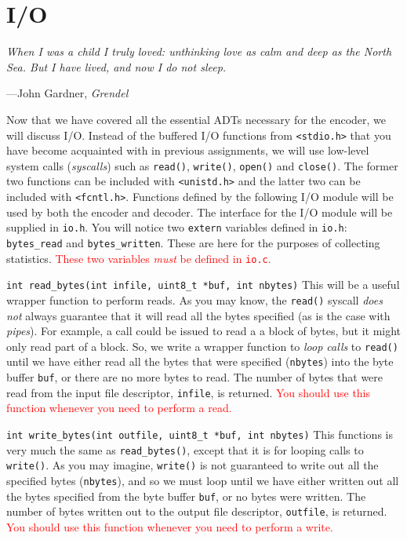 \section{I/O}
\textwidth
\epigraph{\emph{
When I was a child I truly loved:
unthinking love as calm and deep
as the North Sea. But I have lived,
and now I do not sleep.}}{---John Gardner, \emph{Grendel}}

\noindent Now that we have covered all the essential ADTs necessary for
the encoder, we will discuss I/O. Instead of the buffered I/O functions
from \texttt{<stdio.h>} that you have become acquainted with in previous
assignments, we will use low-level system calls (\emph{syscalls}) such
as \texttt{read()}, \texttt{write()}, \texttt{open()} and
\texttt{close()}. The former two functions can be included with
\texttt{<unistd.h>} and the latter two can be included with
\texttt{<fcntl.h>}. Functions defined by the following I/O module will
be used by both the encoder and decoder. The interface for the I/O
module will be supplied in \texttt{io.h}. You will notice two
\texttt{extern} variables defined in \texttt{io.h}: \texttt{bytes\_read}
and \texttt{bytes\_written}. These are here for the purposes of
collecting statistics. \textcolor{red}{These two variables \emph{must}
be defined in \texttt{io.c}.}

\begin{funcdoc}{\texttt{int read\_bytes(int infile, uint8\_t *buf, int
nbytes)}}
  This will be a useful wrapper function to perform reads. As you may
  know, the \texttt{read()} syscall \emph{does not} always guarantee
  that it will read all the bytes specified (as is the case with
  \emph{pipes}). For example, a call could be issued to read a a block
  of bytes, but it might only read part of a block. So, we write a
  wrapper function to \emph{loop calls} to \texttt{read()} until we have
  either read all the bytes that were specified (\texttt{nbytes}) into
  the byte buffer \texttt{buf}, or there are no more bytes to read. The
  number of bytes that were read from the input file descriptor,
  \texttt{infile}, is returned. \textcolor{red}{You should use this
  function whenever you need to perform a read.}
\end{funcdoc}

\begin{funcdoc}{\texttt{int write\_bytes(int outfile, uint8\_t *buf, int
nbytes)}}
  This functions is very much the same as \texttt{read\_bytes()}, except
  that it is for looping calls to \texttt{write()}. As you may imagine,
  \texttt{write()} is not guaranteed to write out all the specified
  bytes (\texttt{nbytes}), and so we must loop until we have either
  written out all the bytes specified from the byte buffer \texttt{buf},
  or no bytes were written. The number of bytes written out to the
  output file descriptor, \texttt{outfile}, is returned.
  \textcolor{red}{You should use this function whenever you need to
  perform a write.}
\end{funcdoc}

